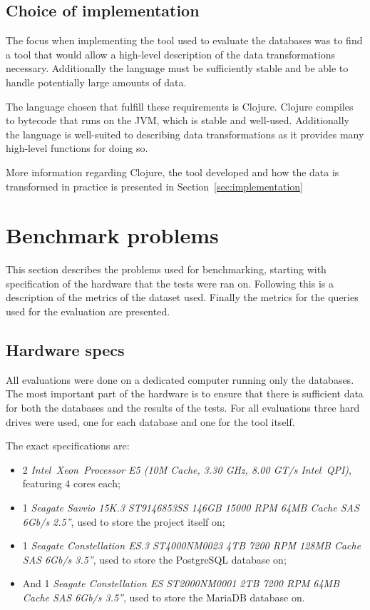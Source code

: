 \subsection{Choice of implementation}\label{sec:implchoice}
The focus when implementing the tool used to evaluate the databases was to find
a tool that would allow a high-level description of the data transformations
necessary. Additionally the language must be sufficiently stable and be able to
handle potentially large amounts of data.

The language chosen that fulfill these requirements is Clojure. Clojure compiles
to bytecode that runs on the JVM, which is stable and well-used. Additionally
the language is well-suited to describing data transformations as it provides
many high-level functions for doing so.

More information regarding Clojure, the tool developed and how the data is
transformed in practice is presented in Section~\ref{sec:implementation}

\section{Benchmark problems}\label{sec:benchmark}
This section describes the problems used for benchmarking, starting with
specification of the hardware that the tests were ran on. Following this is
a description of the metrics of the dataset used. Finally the metrics for the
queries used for the evaluation are presented.

\subsection{Hardware specs}
All evaluations were done on a dedicated computer running only the databases.
The most important part of the hardware is to ensure that there is sufficient
data for both the databases and the results of the tests. For all evaluations
three hard drives were used, one for each database and one for the tool itself.

The exact specifications are:
\begin{itemize}
\item 2 \textit{Intel\,\textregistered{} Xeon\,\textregistered{} Processor
    E5 (10M Cache, 3.30 GHz, 8.00 GT/s Intel\,\textregistered{} QPI)},
  featuring 4 cores each;
\item 1 \textit{Seagate Savvio 15K.3 ST9146853SS 146GB 15000 RPM 64MB Cache SAS 6Gb/s
    2.5''}, used to store the project itself on;
\item 1 \textit{Seagate Constellation ES.3 ST4000NM0023 4TB 7200 RPM 128MB Cache SAS
    6Gb/s 3.5''}, used to store the PostgreSQL database on;
\item And 1 \textit{Seagate Constellation ES ST2000NM0001 2TB 7200 RPM 64MB Cache SAS 6Gb/s
    3.5''}, used to store the MariaDB database on.
\end{itemize}

